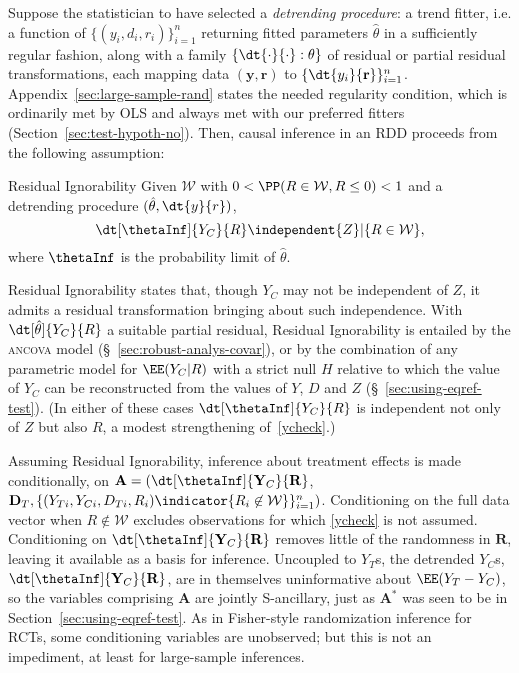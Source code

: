 Suppose the statistician to have selected a \textit{detrending procedure}: a
trend fitter, i.e. a function of
$\{({y}_{i},d_{i},r_{i})\}_{i=1}^{n}$ returning
fitted parameters $\hat{\theta}$ in a sufficiently regular
fashion, along with a
family $\{\dt{\cdot}{\cdot}: \theta\}$ of residual or partial
residual transformations, each mapping data $(\mathbf{y}, \mathbf{r})$ to
$\{\dt {y_{i}}{\mathbf{r}} \}_{i=1}^{n}$.
Appendix~\ref{sec:large-sample-rand}
states the
needed regularity condition, which is ordinarily met by OLS and always
met with our preferred fitters (Section~\ref{sec:test-hypoth-no}).
Then, causal inference in an RDD proceeds from the following assumption:
\begin{ass}{Residual Ignorability}
\sloppy
Given $\mathcal{W}$ with $0< \PP( R \in
\mathcal{W}, R\leq 0) < 1$ and a detrending procedure $(\hat{\theta}, \dt{y}{r})$,
\begin{equation}\label{ycheck}
\dt[\thetaInf]{Y_{C}}{ R }%
\independent {Z}| \{R \in \mathcal{W}\},
\end{equation}
where $\thetaInf$ is the probability limit of $\hat\theta$.
\end{ass}
Residual Ignorability states that, though $Y_C$ may not be independent of
$Z$,  it admits a residual transformation bringing about such
independence. With $\dt[\hat\theta]{Y_{C}}{ R}$ a suitable
partial residual, Residual Ignorability is entailed by the
\textsc{ancova} model (\S~\ref{sec:robust-analys-covar}), or by the combination of any parametric model
for $\EE (Y_{C}| R)$ with a strict null $H$ relative to which the
value of $Y_{C}$ can be reconstructed from the values of $Y$, $D$ and
$Z$ (\S~\ref{sec:using-eqref-test}).
(In either of these cases $\dt[\thetaInf]{Y_{C}}{ R}$
is independent not only of $Z$ but also $R$,
a modest strengthening of~\eqref{ycheck}.)


\sloppy
Assuming Residual Ignorability, inference about treatment effects is
made conditionally, on
$\mathbf{A}= (\dt[\thetaInf]{\mathbf{Y}_{C}}{ \mathbf{R}}$, $\mathbf{D}_{T},
\{(Y_{Ti}, Y_{Ci}, D_{Ti}, R_{i}) \indicator{{R}_{i} \not\in
  \mathcal{W}}\}_{i=1}^{n})$.
Conditioning on the full data vector when $R \not\in \mathcal{W}$
excludes observations for which \eqref{ycheck} is not assumed.
Conditioning on
$\dt[\thetaInf]{\mathbf{Y}_{C}}{ \mathbf{R}}$
removes little of the randomness %
in $\mathbf{R}$, leaving it available as a basis for inference.
Uncoupled to $Y_{T}$s, the detrended  $Y_{C}$s,
$\dt[\thetaInf]{\mathbf{Y}_{C}}{ \mathbf{R}}$,
are in themselves uninformative about $\EE(Y_{T} - Y_{C})$, so
the variables comprising $\mathbf{A}$ are jointly
S-ancillary, just as $\bm{A}^*$ %
was seen to be
in Section~\ref{sec:using-eqref-test}.  As in Fisher-style randomization inference for RCTs, some conditioning variables are
unobserved; but this is not an impediment, at least for large-sample
inferences.

